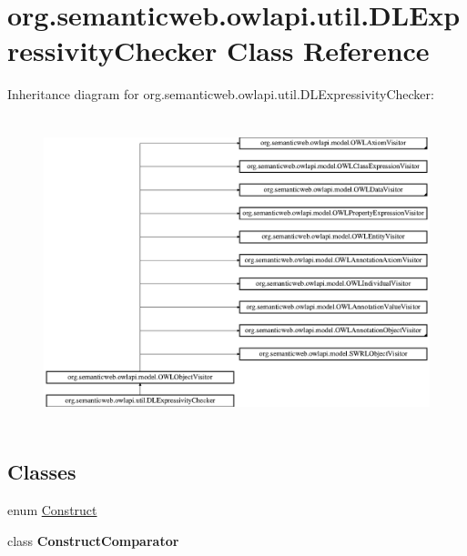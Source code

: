 \hypertarget{classorg_1_1semanticweb_1_1owlapi_1_1util_1_1_d_l_expressivity_checker}{\section{org.\-semanticweb.\-owlapi.\-util.\-D\-L\-Expressivity\-Checker Class Reference}
\label{classorg_1_1semanticweb_1_1owlapi_1_1util_1_1_d_l_expressivity_checker}
}
Inheritance diagram for org.\-semanticweb.\-owlapi.\-util.\-D\-L\-Expressivity\-Checker\-:\begin{figure}[H]
\begin{center}
\leavevmode
\includegraphics[height=9.056604cm]{classorg_1_1semanticweb_1_1owlapi_1_1util_1_1_d_l_expressivity_checker}
\end{center}
\end{figure}
\subsection*{Classes}
\begin{DoxyCompactItemize}
\item 
enum \hyperlink{enumorg_1_1semanticweb_1_1owlapi_1_1util_1_1_d_l_expressivity_checker_1_1_construct}{Construct}
\item 
class {\bfseries Construct\-Comparator}
\end{DoxyCompactItemize}
